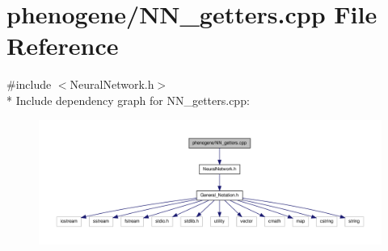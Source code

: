\hypertarget{a00017}{\section{phenogene/\-N\-N\-\_\-getters.cpp File Reference}
\label{d4/d51/a00017}
}
{\ttfamily \#include $<$Neural\-Network.\-h$>$}\\*
Include dependency graph for N\-N\-\_\-getters.\-cpp\-:
\nopagebreak
\begin{figure}[H]
\begin{center}
\leavevmode
\includegraphics[width=350pt]{d8/d41/a00038}
\end{center}
\end{figure}
